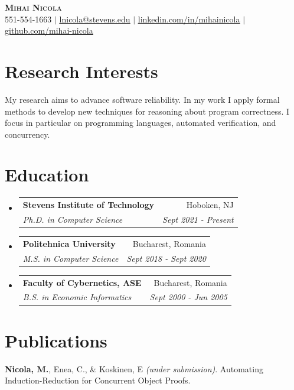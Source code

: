 \documentclass[letterpaper,11pt]{article}
\makeatletter
\newcommand{\resumeSubheading}[4]{
  \vspace{-2pt}\item
    \begin{tabular*}{0.97\textwidth}[t]{l@{\extracolsep{\fill}}r}
      \textbf{#1} & #2 \\
      \textit{\small#3} & \textit{\small #4} \\
    \end{tabular*}\vspace{-7pt}
}
\newcommand{\resumeSubHeadingListStart}{\begin{itemize}[leftmargin=0in, label={}]}
\newcommand{\resumeSubHeadingListEnd}{\end{itemize}}
\makeatother
\begin{document}

\begin{center}
    \textbf{\Huge \scshape Mihai Nicola} \\ \vspace{1pt}
    \small 551-554-1663 $|$ \href{mailto:lnicola@stevens.edu}{\underline{lnicola@stevens.edu}} $|$ 
    \href{https://linkedin.com/in/mihainicola}{\underline{linkedin.com/in/mihainicola}} $|$
    \href{https://github.com/mihai-nicola}{\underline{github.com/mihai-nicola}}
\end{center}


\section{Research Interests}
My research aims to advance software reliability. In my work I apply formal methods to develop new techniques for reasoning about program correctness. I focus in particular on programming languages, automated verification, and concurrency.

\section{Education}
\resumeSubHeadingListStart
\resumeSubheading
{Stevens Institute of Technology}{Hoboken, NJ}
{Ph.D. in Computer Science}{Sept 2021 - Present}
\resumeSubheading
{Politehnica University}{Bucharest, Romania}
{M.S. in Computer Science}{Sept 2018 - Sept 2020}
\resumeSubheading
{Faculty of Cybernetics, ASE}{Bucharest, Romania}
{B.S. in Economic Informatics}{Sept 2000 - Jun 2005}
\resumeSubHeadingListEnd
\vspace{0.1em}

\section{Publications}
\textbf{Nicola, M.}, Enea, C., \& Koskinen, E \emph{(under submission)}. Automating Induction-Reduction for Concurrent Object Proofs.
\\[1em]
\end{document}
